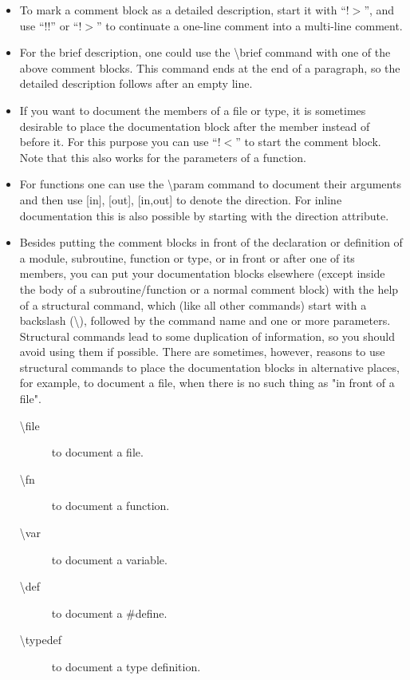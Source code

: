 \documentclass[12pt,letterpaper]{article}
\begin{document}
\begin{itemize}
\item To mark a comment block as a detailed description,
  start it with ``!$>$'', and use ``!!'' or ``!$>$'' to
  continuate a one-line comment into a multi-line comment.
\item For the brief description, one could use the
  \textbackslash brief command with one of the above comment
  blocks. This command ends at the end of a paragraph, so
  the detailed description follows after an empty line.
\item If you want to document the members of a file or type,
  it is sometimes desirable to place the documentation block
  after the member instead of before it. For this purpose
  you can use ``!$<$'' to start the comment block. Note that
  this also works for the parameters of a function.
\item For functions one can use the \textbackslash param
  command to document their arguments and then use [in],
  [out], [in,out] to denote the direction. For inline
  documentation this is also possible by starting with the
  direction attribute.
\item Besides putting the comment blocks in front of the
  declaration or definition of a module, subroutine,
  function or type, or in front or after one of its members,
  you can put your documentation blocks elsewhere (except
  inside the body of a subroutine/function or a normal
  comment block) with the help of a structural command,
  which (like all other commands) start with a backslash
  (\textbackslash), followed by the command name and one or
  more parameters. Structural commands lead to some
  duplication of information, so you should avoid using them
  if possible. There are sometimes, however, reasons to use
  structural commands to place the documentation blocks in
  alternative places, for example, to document a file, when
  there is no such thing as "in front of a file".
\begin{description}
\item[\textbackslash file] to document a file.
\item[\textbackslash fn] to document a function.
\item[\textbackslash var] to document a variable.
\item[\textbackslash def] to document a \#define.
\item[\textbackslash typedef] to document a type definition.
\end{description}
\end{itemize}
\end{document}
